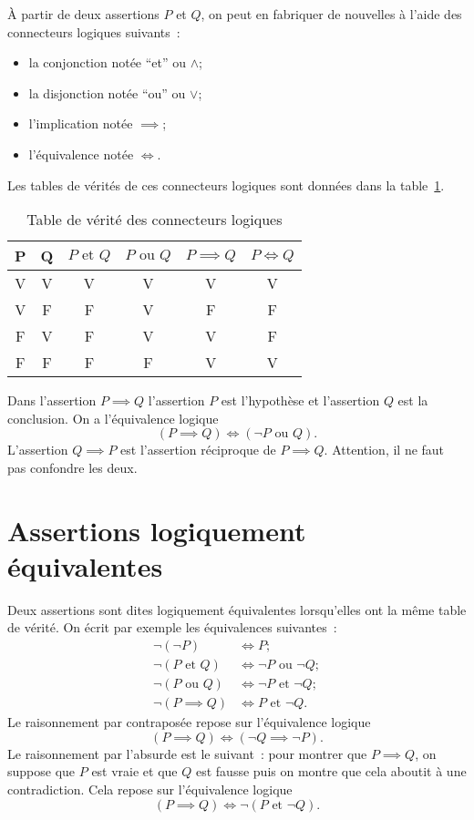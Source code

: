 À partir de deux assertions \(P\) et \(Q\), on peut en fabriquer de nouvelles à l'aide des connecteurs logiques suivants~:
\begin{itemize}
\item la conjonction notée ``et'' ou \(\wedge\);
\item la disjonction notée ``ou'' ou \(\vee\);
\item l'implication notée \(\implies\);
\item l'équivalence notée \(\iff\).
\end{itemize}
Les tables de vérités de ces connecteurs logiques sont données dans la table~\ref{tab:tabverconn}.
\begin{table}[!h]
  \centering
  \begin{tabular}{|c|c|c|c|c|c|}\hline
    P & Q & \(P \text{~et~} Q\) & \(P \text{~ou~} Q\) & \(P \implies Q\) & \(P \iff Q\) \\ \hline
    V & V & V & V & V & V \\
    V & F & F & V & F & F \\
    F & V & F & V & V & F \\
    F & F & F & F & V & V \\ \hline
  \end{tabular}
  \caption{Table de vérité des connecteurs logiques}
  \label{tab:tabverconn}
\end{table}

Dans l'assertion \(P \implies Q\) l'assertion \(P\) est l'hypothèse et l'assertion \(Q\) est la conclusion. On a l'équivalence logique
\begin{equation}
  (P \implies Q) \iff (\neg P \text{~ou~} Q).
\end{equation}
L'assertion \(Q \implies P\) est l'assertion réciproque de \(P \implies Q\). Attention, il ne faut pas confondre les deux.
%
\section{Assertions logiquement équivalentes}
\label{chap0sec:assertionslogiquementequiv}
Deux assertions sont dites logiquement équivalentes lorsqu'elles ont la même table de vérité. On écrit par exemple les équivalences suivantes~:
\begin{align}
  \neg(\neg P) &\iff P; \\
  \neg(P \text {~et~} Q) & \iff \neg P \text{~ou~} \neg Q; \\
  \neg(P \text{~ou~} Q) & \iff \neg P \text {~et~} \neg Q; \\
  \neg(P \implies Q) & \iff P \text {~et~} \neg Q.
\end{align}
Le raisonnement par contraposée repose sur l'équivalence logique
\begin{equation}
  (P \implies Q) \iff (\neg Q \implies \neg P).
\end{equation}
Le raisonnement par l'absurde est le suivant~: pour montrer que \(P \implies Q\), on suppose que \(P\) est vraie et que \(Q\) est fausse puis on montre que cela aboutit à une contradiction. Cela repose sur l'équivalence logique
\begin{equation}
  (P \implies Q) \iff \neg(P \text {~et~} \neg Q).
\end{equation}
%
